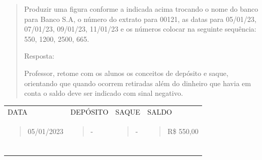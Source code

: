 \begin{quote}
Produzir uma figura conforme a indicada acima trocando o nome do banco
para Banco S.A, o número do extrato para 00121, as datas para 05/01/23,
07/01/23, 09/01/23, 11/01/23 e os números colocar na seguinte sequência:
550, 1200, 2500, 665.

Resposta:

Professor, retome com os alunos os conceitos de depósito e saque,
orientando que quando ocorrem retiradas além do dinheiro que havia em
conta o saldo deve ser indicado com sinal negativo.
\end{quote}

\begin{longtable}[]{@{}llll@{}}
\toprule
\endhead
\begin{minipage}[t]{0.18\columnwidth}\raggedright
DATA\strut
\end{minipage} & \begin{minipage}[t]{0.20\columnwidth}\raggedright
DEPÓSITO\strut
\end{minipage} & \begin{minipage}[t]{0.20\columnwidth}\raggedright
SAQUE\strut
\end{minipage} & \begin{minipage}[t]{0.20\columnwidth}\raggedright
SALDO\strut
\end{minipage}\tabularnewline
\begin{minipage}[t]{0.18\columnwidth}\raggedright
\begin{quote}
05/01/2023
\end{quote}\strut
\end{minipage} & \begin{minipage}[t]{0.20\columnwidth}\raggedright
\begin{quote}
-
\end{quote}\strut
\end{minipage} & \begin{minipage}[t]{0.20\columnwidth}\raggedright
\begin{quote}
-
\end{quote}\strut
\end{minipage} & \begin{minipage}[t]{0.20\columnwidth}\raggedright
\begin{quote}
R\$ 550,00
\end{quote}\strut
\end{minipage}\tabularnewline
\begin{minipage}[t]{0.18\columnwidth}\raggedright
\begin{quote}

\end{quote}
\end{minipage}
\end{longtable}
